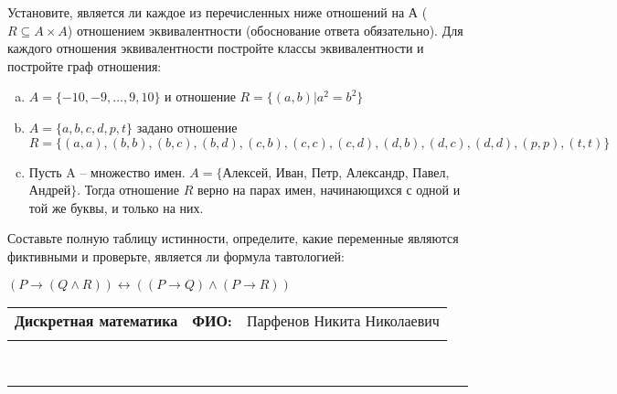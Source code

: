 \documentclass[10pt]{exam}
\newcommand{\class}{Дискретная математика}
\newcommand{\examdate}{}
\begin{document}
\begin{questions}
\question
Установите, является ли каждое из перечисленных ниже отношений на А ($R \subseteq A \times A$) отношением эквивалентности (обоснование ответа обязательно). Для каждого отношения эквивалентности постройте классы 
эквивалентности и постройте граф отношения:
\begin{enumerate} [a)]\setcounter{enumi}{0}
\item $A = \{-10, -9, … , 9, 10\}$ и отношение $R = \{(a,b)|a^{2} = b^{2}\}$
\item $A = \{a, b, c, d, p, t\}$ задано отношение $R = \{(a, a), (b, b), (b, c), (b, d), (c, b), (c, c), (c, d), (d, b), (d, c), (d, d), (p,p), (t,t)\}$
\item Пусть A – множество имен. $A = \{ $Алексей, Иван, Петр, Александр, Павел, Андрей$ \}$. Тогда отношение $R$ верно на парах имен, начинающихся с одной и той же буквы, и только на них.
\end{enumerate}\question Составьте полную таблицу истинности, определите, какие переменные являются фиктивными и проверьте, является ли формула тавтологией:

$(P \rightarrow (Q \land R)) \leftrightarrow ((P \rightarrow Q) \land (P \rightarrow R))$

\end{questions}
\newpage
\begin{flushright}
\begin{tabular}{p{2.8in} r l}
\textbf{\class} & \textbf{ФИО:} &Парфенов Никита Николаевич
\\

\textbf{\examdate} &&\\
\end{tabular}\\
\end{flushright}
\rule[1ex]{\textwidth}{.1pt}
\end{document}

